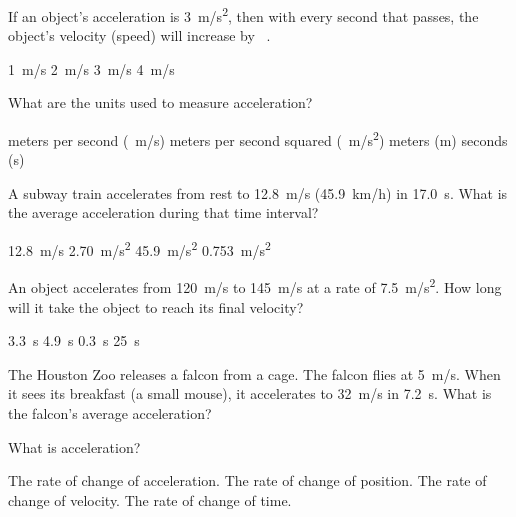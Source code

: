 \documentclass[]{exam}
\theoremstyle{definition}
\begin{document}
\begin{questions}





\question
If an object's acceleration is \SI{3}{m/s^2}, then with every second that passes, the object's velocity (speed) will increase by \fillin[][2cm]\ .

\begin{choices}
    \choice \SI{1}{m/s}
    \choice \SI{2}{m/s}
    \correctchoice \SI{3}{m/s}
    \choice \SI{4}{m/s}
\end{choices}



\question
What are the units used to measure acceleration?

\begin{choices}
    \choice meters per second (\SI{}{m/s})
    \correctchoice meters per second squared (\SI{}{m/s^2})
    \choice meters (m)
    \choice seconds (s)
\end{choices}


\question %
A subway train accelerates from rest to \SI{12.8}{m/s} (\SI{45.9}{km/h}) in \SI{17.0}{s}. What is the average acceleration during that time interval?

\begin{choices}
\choice \SI{12.8}{m/s}
\choice \SI{2.70}{m/s^2}
\choice \SI{45.9}{m/s^2}
\CorrectChoice \SI{0.753}{m/s^2} 
\end{choices}




\question
An object accelerates from \SI{120}{m/s} to \SI{145}{m/s} at a rate of \SI{7.5}{m/s^2}. How long will it take the object to reach its final velocity?

\begin{choices}
    \correctchoice \SI{3.3}{s}
    \choice \SI{4.9}{s}
    \choice \SI{0.3}{s}
    \choice \SI{25}{s}
\end{choices}


\question
The Houston Zoo releases a falcon from a cage. The falcon flies at \SI{5}{m/s}. When it sees its breakfast (a small mouse), it accelerates to \SI{32}{m/s} in \SI{7.2}{s}. What is the falcon's average acceleration?



\question
What is acceleration?

\begin{choices}
\choice The rate of change of acceleration.
\choice The rate of change of position. 
\CorrectChoice The rate of change of velocity.
\choice The rate of change of time.
\end{choices}


\end{questions}
\end{document}
